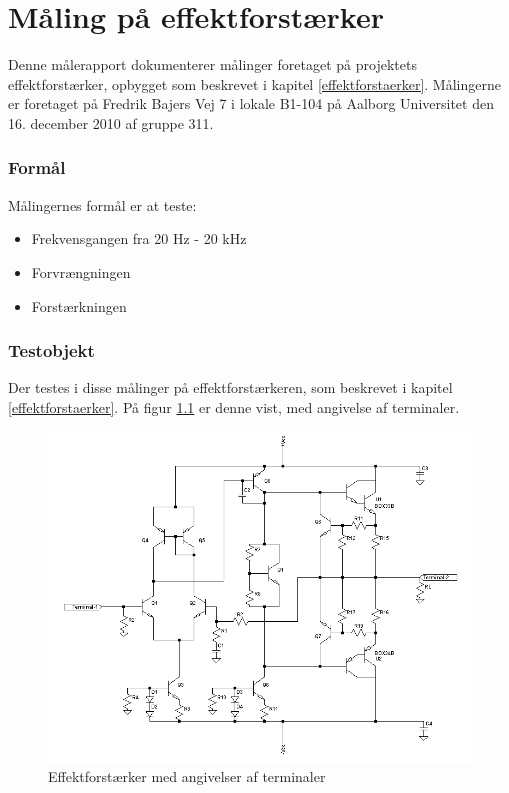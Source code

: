 \chapter{Måling på effektforstærker}
\label{maalejournal-effekt}

Denne målerapport dokumenterer målinger foretaget på projektets effektforstærker, opbygget som beskrevet i kapitel \ref{effektforstaerker}. Målingerne er foretaget på Fredrik Bajers Vej 7 i lokale B1-104 på Aalborg Universitet den 16. december 2010 af gruppe 311.

\subsection*{Formål}

Målingernes formål er at teste:
\begin{itemize}
\item Frekvensgangen fra 20 Hz - 20 kHz
\item Forvrængningen
\item Forstærkningen
\end{itemize}

\subsection*{Testobjekt}
Der testes i disse målinger på effektforstærkeren, som beskrevet i kapitel \ref{effektforstaerker}. På figur \ref{fig:testob_efforstaerker} er denne vist, med angivelse af terminaler.

\begin{figure}[h]
\centering
\includegraphics[width=\textwidth]{maalerapporter/effektforstaerker/effektforstaerker_maelerapport.png}
\caption{Effektforstærker med angivelser af terminaler}
\label{fig:testob_efforstaerker}
\end{figure}


